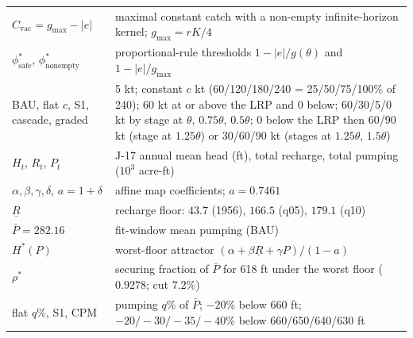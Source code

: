 \documentclass[11pt,a4paper]{article}
\newcommand{\LRP}{\theta}
\newcommand{\Cvac}{C_{\mathrm{vac}}}
\newcommand{\gmax}{g_{\max}}
\newcommand{\Hstar}{H^{*}}
\newcommand{\Pbar}{\bar P}
\begin{document}
\begin{longtable}{p{}p{}}
$\Cvac=\gmax-|e|$ & maximal constant catch with a non-empty infinite-horizon kernel; $\gmax=rK/4$ \\
$\phi^*_{\mathrm{safe}}$, $\phi^*_{\mathrm{nonempty}}$ & proportional-rule thresholds $1-|e|/g(\LRP)$ and $1-|e|/\gmax$ \\
BAU, flat $c$, S1, cascade, graded & 5 kt; constant $c$ kt (60/120/180/240 = 25/50/75/100\% of 240); 60 kt at or above the LRP and 0 below; 60/30/5/0 kt by stage at $\LRP$, $0.75\LRP$, $0.5\LRP$; 0 below the LRP then 60/90 kt (stage at $1.25\LRP$) or 30/60/90 kt (stages at $1.25\LRP$, $1.5\LRP$) \\
\midrule
$H_t$, $R_t$, $P_t$ & J-17 annual mean head (ft), total recharge, total pumping ($10^3$ acre-ft) \\
$\alpha,\beta,\gamma,\delta$, $a=1+\delta$ & affine map coefficients; $a=0.7461$ \\
$\underline R$ & recharge floor: $43.7$ (1956), $166.5$ (q05), $179.1$ (q10) \\
$\Pbar=282.16$ & fit-window mean pumping (BAU) \\
$\Hstar(P)$ & worst-floor attractor $(\alpha+\beta\underline R+\gamma P)/(1-a)$ \\
$\rho^*$ & securing fraction of $\Pbar$ for 618 ft under the worst floor ($0.9278$; cut $7.2\%$) \\
flat $q\%$, S1, CPM & pumping $q\%$ of $\Pbar$; $-20\%$ below 660 ft; $-20/-30/-35/-40\%$ below 660/650/640/630 ft \\
\bottomrule
\end{longtable}
\end{document}
